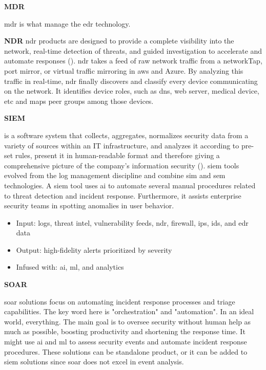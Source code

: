 \begin{multicols}{2}
      \textbf{MDR}

      \acrshort{mdr} is what manage the \acrshort{edr} technology.

      \textbf{NDR} \label{sec:ndr}
      \acrshort{ndr} products are designed to provide a complete visibility into the network, real-time detection of threats, and guided
      investigation to accelerate and automate responses (\textit{\cite{sentinelOneNDR}}). \acrshort{ndr} takes a feed of raw network traffic
      from a \gls{networkTap}, port mirror, or virtual traffic mirroring in \acrshort{aws} and Azure. By analyzing this traffic in real-time,
      \acrshort{ndr} finally discovers and classify every device communicating on the network. It identifies device roles, such as \acrshort{dns},
      web server, medical device, \acrshort{etc} and maps peer groups among those devices.

      \textbf{SIEM}

      is a software system that collects, aggregates, normalizes security data from a variety of sources within an IT infrastructure, and
      analyzes it according to pre-set rules, present it in human-readable format and therefore giving a comprehensive picture of the company's
      information security (\cite{siemGartner}). \acrshort{siem} tools evolved from the log management discipline and combine \acrshort{sim} and
      \acrshort{sem} technologies. A \acrshort{siem} tool uses \acrshort{ai} to automate several manual procedures related to threat
      detection and incident response. Furthermore, it assists enterprise security teams in spotting anomalies in user behavior.

      \begin{itemize}
            \item Input: logs, threat intel, vulnerability feeds, \acrshort{ndr}, firewall, \acrshort{ips}, \acrshort{ids}, and \acrshort{edr}
                  data
            \item Output: high-fidelity alerts prioritized by severity
            \item Infused with: \acrshort{ai}, \acrshort{ml}, and analytics
      \end{itemize}

      \textbf{SOAR}

      \acrshort{soar} solutions focus on automating incident response processes and triage capabilities. The key word here is
      "orchestration" and "automation". In an ideal world, everything.
      The main goal is to oversee security without human help as much as possible, boosting productivity and shortening the response time.
      It might use \acrshort{ai} and \acrshort{ml} to assess security events and automate incident response procedures. These solutions
      can be standalone product, or it can be added to \acrshort{siem} solutions since \acrshort{soar} does not excel in event analysis.


\end{multicols}
